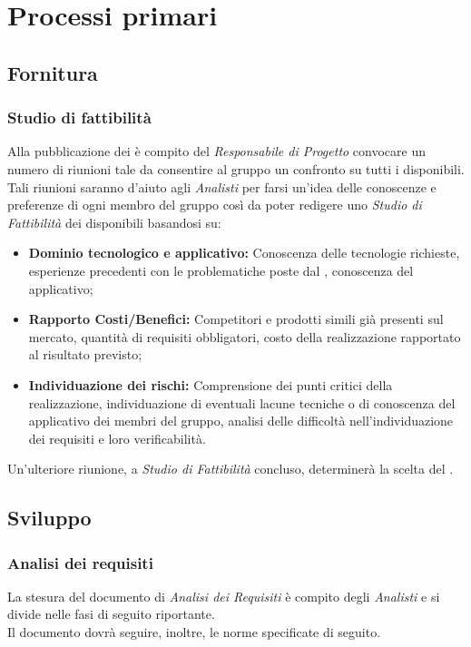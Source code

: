 \section{Processi primari}
	\subsection{Fornitura}
		\subsubsection{Studio di fattibilità}
		Alla pubblicazione dei  è compito del \emph{Responsabile di Progetto} convocare un numero di riunioni tale da consentire
    al gruppo un confronto su tutti i  disponibili.\\
    Tali riunioni saranno d'aiuto agli \emph{Analisti} per farsi un'idea delle conoscenze e preferenze di ogni membro del gruppo così da
    poter redigere uno \emph{Studio di Fattibilità} dei  disponibili basandosi su:\\
    \begin{itemize}
      \item \textbf{Dominio tecnologico e applicativo: }Conoscenza delle tecnologie richieste, esperienze precedenti con le problematiche poste dal , conoscenza del
       applicativo;
      \item \textbf{Rapporto Costi/Benefici: }Competitori e prodotti simili già presenti sul mercato, quantità di requisiti obbligatori, costo della realizzazione rapportato al
      risultato previsto;
      \item \textbf{Individuazione dei rischi: }Comprensione dei punti critici della realizzazione, individuazione di eventuali lacune tecniche o di conoscenza del  applicativo
      dei membri del gruppo, analisi delle difficoltà nell’individuazione dei requisiti e loro verificabilità.
    \end{itemize}
    Un'ulteriore riunione, a \emph{Studio di Fattibilità} concluso, determinerà la scelta del .
	\subsection{Sviluppo}
		\subsubsection{Analisi dei requisiti}
		 La stesura del documento di \emph{Analisi dei Requisiti} è compito degli \emph{Analisti} e si divide nelle fasi di seguito riportante.\\
    Il documento dovrà seguire, inoltre, le norme specificate di seguito.
